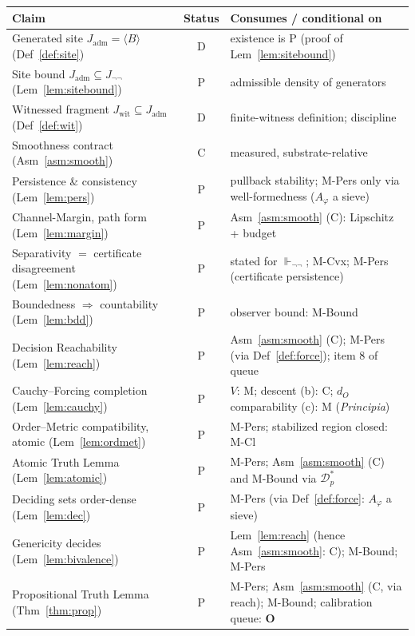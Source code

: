 \documentclass[11pt]{article}
\theoremstyle{definition}
\theoremstyle{remark}
\newcommand{\forcesnn}{\Vdash_{\neg\neg}}
\newcommand{\Jadm}{J_{\mathrm{adm}}}
\newcommand{\Jwit}{J_{\mathrm{wit}}}
\newcommand{\Jnn}{J_{\neg\neg}}
\begin{document}
\begin{center}
\renewcommand{\arraystretch}{1.2}
\begin{tabular}{@{}p{} c p{}@{}}
\toprule
\textbf{Claim} & \textbf{Status} & \textbf{Consumes / conditional on}\\
\midrule
Generated site $\Jadm=\langle B\rangle$ (Def~\ref{def:site}) & D & existence is P (proof of Lem~\ref{lem:sitebound})\\
Site bound $\Jadm\subseteq\Jnn$ (Lem~\ref{lem:sitebound}) & P & admissible density of generators\\
Witnessed fragment $\Jwit\subseteq\Jadm$ (Def~\ref{def:wit}) & D & finite-witness definition; discipline\\
Smoothness contract (Asm~\ref{asm:smooth}) & C & measured, substrate-relative\\
Persistence \& consistency (Lem~\ref{lem:pers}) & P & pullback stability; M-Pers only via well-formedness ($A_\varphi$ a sieve)\\
Channel-Margin, path form (Lem~\ref{lem:margin}) & P & Asm~\ref{asm:smooth} (C): Lipschitz + budget\\
Separativity $=$ certificate disagreement (Lem~\ref{lem:nonatom}) & P & stated for $\forcesnn$; M-Cvx; M-Pers (certificate persistence)\\
Boundedness $\Rightarrow$ countability (Lem~\ref{lem:bdd}) & P & observer bound: M-Bound\\
Decision Reachability (Lem~\ref{lem:reach}) & P & Asm~\ref{asm:smooth} (C); M-Pers (via Def~\ref{def:force}); item 8 of queue\\
Cauchy--Forcing completion (Lem~\ref{lem:cauchy}) & P & $V$: M; descent (b): C; $d_O$ comparability (c): M (\emph{Principia})\\
Order--Metric compatibility, atomic (Lem~\ref{lem:ordmet}) & P & M-Pers; stabilized region closed: M-Cl\\
Atomic Truth Lemma (Lem~\ref{lem:atomic}) & P & M-Pers; Asm~\ref{asm:smooth} (C) and M-Bound via $\mathcal{D}_p^\ast$\\
Deciding sets order-dense (Lem~\ref{lem:dec}) & P & M-Pers (via Def~\ref{def:force}: $A_\varphi$ a sieve)\\
Genericity decides (Lem~\ref{lem:bivalence}) & P & Lem~\ref{lem:reach} (hence Asm~\ref{asm:smooth}: C); M-Bound; M-Pers\\
Propositional Truth Lemma (Thm~\ref{thm:prop}) & P & M-Pers; Asm~\ref{asm:smooth} (C, via reach); M-Bound; calibration queue: \textbf{O}\\

\end{tabular}
\end{center}
\end{document}
